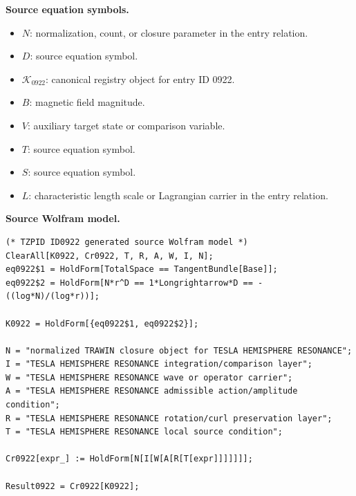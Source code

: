 \begin{minipage}[t]{0.49\linewidth}
\begingroup
\small
\raggedright
\textbf{Source equation symbols.}\par
\begin{itemize}[leftmargin=1.35em,itemsep=1pt,topsep=1pt,parsep=0pt]
    \item $N$: normalization, count, or closure parameter in the entry relation.
    \item $D$: source equation symbol.
    \item $\mathcal{K}_{0922}$: canonical registry object for entry ID 0922.
    \item $B$: magnetic field magnitude.
    \item $V$: auxiliary target state or comparison variable.
    \item $T$: source equation symbol.
    \item $S$: source equation symbol.
    \item $L$: characteristic length scale or Lagrangian carrier in the entry relation.
\end{itemize}
\endgroup
\end{minipage}\hfill
\begin{minipage}[t]{0.47\linewidth}
\begingroup
\scriptsize
\raggedright
\textbf{Source Wolfram model.}\par
\begin{Verbatim}[fontsize=\tiny,breaklines=true,breakanywhere=true]
(* TZPID ID0922 generated source Wolfram model *)
ClearAll[K0922, Cr0922, T, R, A, W, I, N];
eq0922$1 = HoldForm[TotalSpace == TangentBundle[Base]];
eq0922$2 = HoldForm[N*r^D == 1*Longrightarrow*D == -((log*N)/(log*r))];

K0922 = HoldForm[{eq0922$1, eq0922$2}];

N = "normalized TRAWIN closure object for TESLA HEMISPHERE RESONANCE";
I = "TESLA HEMISPHERE RESONANCE integration/comparison layer";
W = "TESLA HEMISPHERE RESONANCE wave or operator carrier";
A = "TESLA HEMISPHERE RESONANCE admissible action/amplitude condition";
R = "TESLA HEMISPHERE RESONANCE rotation/curl preservation layer";
T = "TESLA HEMISPHERE RESONANCE local source condition";

Cr0922[expr_] := HoldForm[N[I[W[A[R[T[expr]]]]]]];

Result0922 = Cr0922[K0922];
\end{Verbatim}
\endgroup
\end{minipage}

